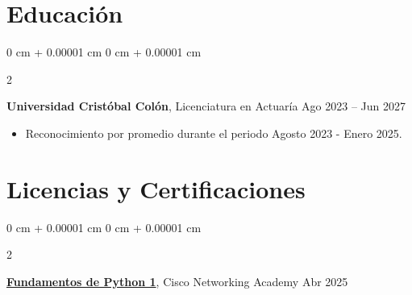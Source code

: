 \documentclass[10pt, letterpaper]{article}
\newenvironment{highlights}{
    \begin{itemize}[
        topsep=0.10 cm,
        parsep=0.10 cm,
        partopsep=0pt,
        itemsep=0pt,
        leftmargin=0 cm + 10pt
    ]
}{
    \end{itemize}
} %
\newenvironment{onecolentry}{
    \begin{adjustwidth}{
        0 cm + 0.00001 cm
    }{
        0 cm + 0.00001 cm
    }
}{
    \end{adjustwidth}
} %
\newenvironment{twocolentry}[2][]{
    \onecolentry
    \def\secondColumn{#2}
    \setcolumnwidth{\fill, 4.5 cm}
    \begin{paracol}{2}
}{
    \switchcolumn \raggedleft \secondColumn
    \end{paracol}
    \endonecolentry
} %
\begin{document}
        


    
    \section{Educación}
        
        \begin{twocolentry}{
            Ago 2023 – Jun 2027
        }
            \textbf{Universidad Cristóbal Colón}, Licenciatura en Actuaría\end{twocolentry}
                \begin{highlights}
                    \item Reconocimiento por promedio durante el periodo Agosto 2023 - Enero 2025.
                \end{highlights}    
        \vspace{0.10 cm}

 \section{Licencias y Certificaciones}

        \begin{twocolentry}{
            Abr 2025
        }
            \href{https://www.credly.com/badges/bcacb0c9-c50e-44ce-a68c-ddd050b1626e/public_url}{\textbf{Fundamentos de Python 1}}, Cisco Networking Academy \end{twocolentry}
\end{document}
